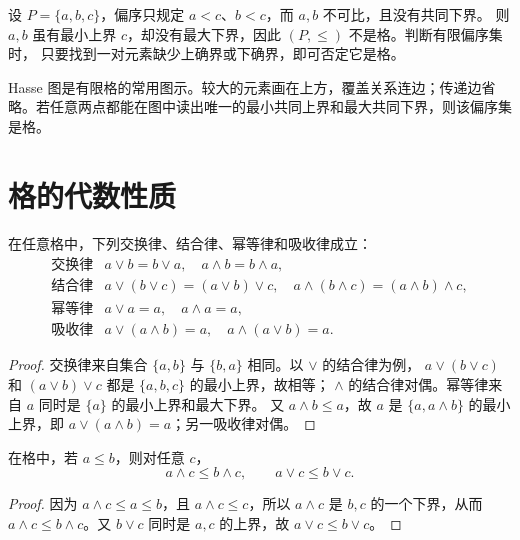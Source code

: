 \begin{example}[title={偏序集不一定是格}]\label{poset-not-lattice}
  设 $P=\{a,b,c\}$，偏序只规定 $a<c$、$b<c$，而 $a,b$ 不可比，且没有共同下界。
  则 $a,b$ 虽有最小上界 $c$，却没有最大下界，因此 $(P,\le)$ 不是格。判断有限偏序集时，
  只要找到一对元素缺少上确界或下确界，即可否定它是格。
\end{example}

Hasse 图是有限格的常用图示。较大的元素画在上方，覆盖关系连边；传递边省略。若任意两点都能在图中读出唯一的最小共同上界和最大共同下界，则该偏序集是格。

\section{格的代数性质}

\begin{theorem}[格的基本律]\label{lattice-basic-laws}
  在任意格中，下列交换律、结合律、幂等律和吸收律成立：
\[
\begin{array}{ll}
\text{交换律} & a\vee b=b\vee a,\quad a\wedge b=b\wedge a,\\[0.2em]
\text{结合律} & a\vee(b\vee c)=(a\vee b)\vee c,\quad a\wedge(b\wedge c)=(a\wedge b)\wedge c,\\[0.2em]
\text{幂等律} & a\vee a=a,\quad a\wedge a=a,\\[0.2em]
\text{吸收律} & a\vee(a\wedge b)=a,\quad a\wedge(a\vee b)=a.
\end{array}
\]
\end{theorem}

\begin{proof}
  交换律来自集合 $\{a,b\}$ 与 $\{b,a\}$ 相同。以 $\vee$ 的结合律为例，
  $a\vee(b\vee c)$ 和 $(a\vee b)\vee c$ 都是 $\{a,b,c\}$ 的最小上界，故相等；
  $\wedge$ 的结合律对偶。幂等律来自 $a$ 同时是 $\{a\}$ 的最小上界和最大下界。
  又 $a\wedge b\le a$，故 $a$ 是 $\{a,a\wedge b\}$ 的最小上界，即
  $a\vee(a\wedge b)=a$；另一吸收律对偶。
\end{proof}

\begin{theorem}[格运算的单调性]\label{lattice-monotonicity}
  在格中，若 $a\le b$，则对任意 $c$，
  \[
  a\wedge c\le b\wedge c,\qquad a\vee c\le b\vee c.
  \]
\end{theorem}

\begin{proof}
  因为 $a\wedge c\le a\le b$，且 $a\wedge c\le c$，所以 $a\wedge c$ 是
  $b,c$ 的一个下界，从而 $a\wedge c\le b\wedge c$。又 $b\vee c$ 同时是
  $a,c$ 的上界，故 $a\vee c\le b\vee c$。
\end{proof}

